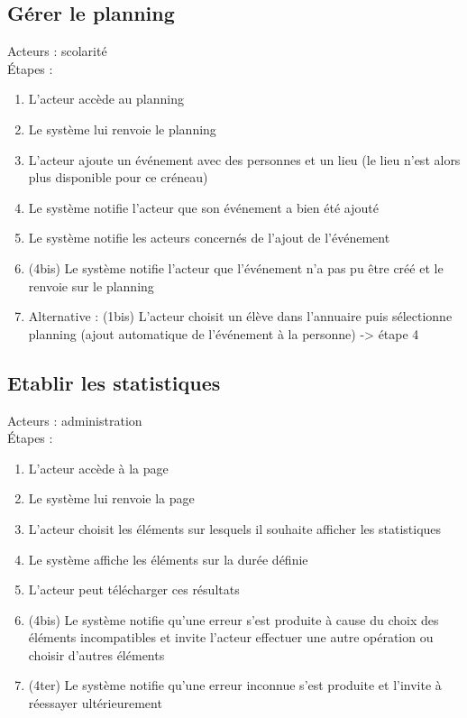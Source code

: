 \documentclass{scrreprt}
\begin{document}
\subsection{Gérer le planning}
Acteurs : scolarité
\\
\'Etapes : 
\begin{enumerate}
\item L’acteur accède au planning
\item Le système lui renvoie le planning
\item L’acteur ajoute un événement avec des personnes et un lieu (le lieu n’est alors plus disponible pour ce créneau) 
\item Le système notifie l’acteur que son événement a bien été ajouté
\item Le système notifie les acteurs concernés de l’ajout de l’événement
\item (4bis) Le système notifie l’acteur que l’événement n’a pas pu être créé et le renvoie sur le planning
\item Alternative : (1bis) L’acteur choisit un élève dans l’annuaire puis sélectionne planning (ajout automatique de l’événement à la personne) -> étape 4
\end{enumerate}
\subsection{Etablir les statistiques}
Acteurs : administration
\\
\'Etapes : 
\begin{enumerate}
\item L’acteur accède à la page
\item Le système lui renvoie la page
\item L’acteur choisit les éléments sur lesquels il souhaite afficher les statistiques
\item Le système affiche les éléments sur la durée définie
\item L’acteur peut télécharger ces résultats
\item (4bis) Le système notifie qu’une erreur s’est produite à cause du choix des éléments incompatibles et invite l’acteur effectuer une autre opération ou choisir d’autres éléments
\item (4ter) Le système notifie qu’une erreur inconnue s’est produite et l’invite à réessayer ultérieurement
\end{enumerate}
\end{document}
